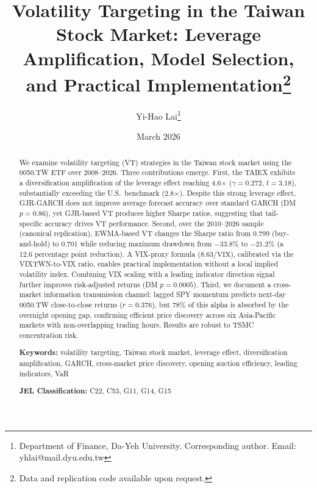 \documentclass[12pt,a4paper]{article}
\title{Volatility Targeting in the Taiwan Stock Market: Leverage Amplification, Model Selection, and Practical Implementation\thanks{Data and replication code available upon request.}}
\author{Yi-Hao Lai\thanks{Department of Finance, Da-Yeh University. Corresponding author. Email: yhlai@mail.dyu.edu.tw}}
\date{March 2026}
\begin{document}
\maketitle

\begin{abstract}
\noindent
We examine volatility targeting (VT) strategies in the Taiwan stock market using the 0050.TW ETF over 2008--2026. Three contributions emerge. First, the TAIEX exhibits a diversification amplification of the leverage effect reaching 4.6$\times$ ($\gamma = 0.272$, $t = 3.18$), substantially exceeding the U.S.\ benchmark (2.8$\times$). Despite this strong leverage effect, GJR-GARCH does not improve average forecast accuracy over standard GARCH (DM $p = 0.86$), yet GJR-based VT produces higher Sharpe ratios, suggesting that tail-specific accuracy drives VT performance. Second, over the 2010--2026 sample (canonical replication), EWMA-based VT changes the Sharpe ratio from 0.799 (buy-and-hold) to 0.701 while reducing maximum drawdown from $-33.8\%$ to $-21.2\%$ (a 12.6 percentage point reduction). A VIX-proxy formula ($8.63/\text{VIX}$), calibrated via the VIXTWN-to-VIX ratio, enables practical implementation without a local implied volatility index. Combining VIX scaling with a leading indicator direction signal further improves risk-adjusted returns (DM $p = 0.0005$). Third, we document a cross-market information transmission channel: lagged SPY momentum predicts next-day 0050.TW close-to-close returns ($r = 0.376$), but 78\% of this alpha is absorbed by the overnight opening gap, confirming efficient price discovery across six Asia-Pacific markets with non-overlapping trading hours. Results are robust to TSMC concentration risk.

\medskip
\noindent
\textbf{Keywords:} volatility targeting, Taiwan stock market, leverage effect, diversification amplification, GARCH, cross-market price discovery, opening auction efficiency, leading indicators, VaR

\medskip
\noindent
\textbf{JEL Classification:} C22, C53, G11, G14, G15
\end{abstract}


\end{document}
